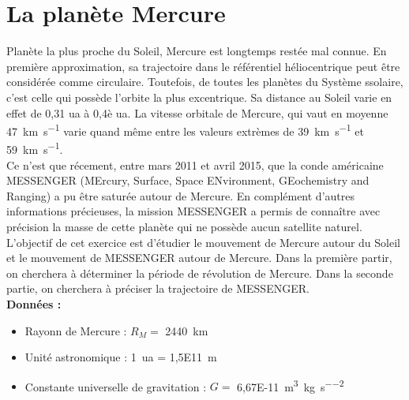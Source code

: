 \documentclass[a4paper,11pt,fleqn]{article}%
\begin{document}
\section{La planète Mercure}
Planète la plus proche du Soleil, Mercure est longtemps restée mal connue. En première approximation, sa trajectoire dans le référentiel héliocentrique peut être considérée comme circulaire. Toutefois, de toutes les planètes du Système ssolaire, c'est celle qui possède l'orbite la plus excentrique. Sa distance au Soleil varie en effet de 0,31 ua à 0,4è ua. La vitesse orbitale de Mercure, qui vaut en moyenne \SI{47}{\kilo\meter\per\second} varie quand même entre les valeurs extrèmes de \SI{39}{\kilo\meter\per\second} et \SI{59}{\kilo\meter\per\second}.\\
Ce n'est que récement, entre mars 2011 et avril 2015, que la conde américaine MESSENGER (MErcury, Surface, Space ENvironment, GEochemistry and Ranging) a pu être saturée autour de Mercure. En complément d'autres informations précieuses, la mission MESSENGER a permis de connaître avec précision la masse de cette planète qui ne possède aucun satellite naturel.\\
L'objectif de cet exercice est d'étudier le mouvement de Mercure autour du Soleil et le mouvement de MESSENGER autour de Mercure. Dans la première partir, on cherchera à déterminer la période de révolution de Mercure. Dans la seconde partie, on cherchera à préciser la trajectoire de MESSENGER.\\
\textbf{Données :}
\begin{itemize}
    \item Rayonn de Mercure : $R_M =$ \SI{2440}{km}
    \item Unité astronomique : \SI{1}{ua} = \SI{1,5E11}{m}
    \item Constante universelle de gravitation : $G =$ \SI{6,67E-11}{\meter\cubed\per\kilo\gram\per\second\squared}
\end{itemize}
\end{document}
